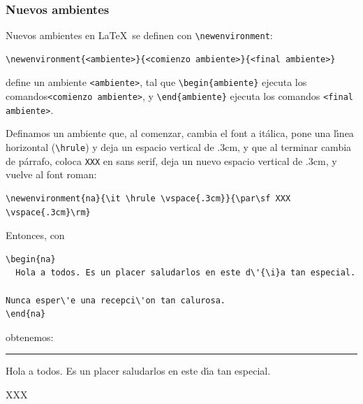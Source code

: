 {\subsubsection{Nuevos ambientes}

Nuevos ambientes en \LaTeX\ se definen con \verb+\newenvironment+:

\begin{verbatim}
\newenvironment{<ambiente>}{<comienzo ambiente>}{<final ambiente>}
\end{verbatim}
define un ambiente \verb+<ambiente>+, tal que \verb+\begin{ambiente}+
  ejecuta los comandos\linebreak \verb+<comienzo ambiente>+, y
  \verb+\end{ambiente}+ ejecuta los comandos \verb+<final ambiente>+. 

Definamos un ambiente que, al comenzar, cambia el font a it\'alica,
pone una l\'{\i}nea horizontal (\verb+\hrule+) y deja un espacio
vertical de .3cm, y que al terminar cambia de p\'arrafo, coloca
\verb+XXX+ en sans serif, deja un nuevo espacio vertical de .3cm, y
vuelve al font roman:


\vspace{.3cm}
{\small
\begin{minipage}[t]{10cm}
\begin{verbatim}
\newenvironment{na}{\it \hrule \vspace{.3cm}}{\par\sf XXX \vspace{.3cm}\rm}
\end{verbatim}
\end{minipage}
}
\vspace{.3cm}

Entonces, con

\vspace{.3cm}
{\small
\begin{minipage}[t]{10cm}
\begin{verbatim}
\begin{na}
  Hola a todos. Es un placer saludarlos en este d\'{\i}a tan especial.

Nunca esper\'e una recepci\'on tan calurosa.
\end{na}
\end{verbatim}
\end{minipage}
}
\vspace{.3cm}

\noindent
obtenemos:

{\small
\begin{center}
\begin{minipage}[t]{10cm}
\newenvironment{na}{\it \hrule \vspace{.3cm}}{\par\sf XXX \vspace{.3cm}\rm}
\begin{na}
  Hola a todos. Es un placer saludarlos en este d\'{\i}a tan especial.


\end{na}
\end{minipage}
\end{center}}}

